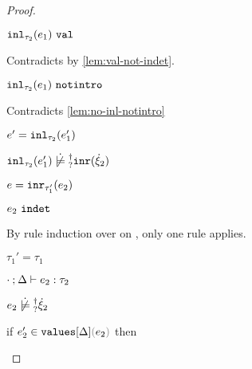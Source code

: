 \begin{proof}
\begin{byCases}
\begin{byCases}
\begin{byCases}
\begin{byCases}
            \begin{pfsteps*}
            \item $\mathtt{inl}_{\tau_2}({e_1}) ~\mathtt{val}$ 
            \end{pfsteps*}
            Contradicts  by \autoref{lem:val-not-indet}.
          \item[\text{(\ref{rule:IVIndet})}]
            \begin{pfsteps*}
            \item $\mathtt{inl}_{\tau_2}({e_1}) ~\mathtt{notintro}$ 
            \end{pfsteps*}
            Contradicts \autoref{lem:no-inl-notintro} 
          \item[\text{(\ref{rule:IVInl})}]
            \begin{pfsteps*}
            \item $e'=\mathtt{inl}_{\tau_2}({e_1'})$ 
            \item $\cnotsatisfyormay{\hinl{\tau_2}{e_1'}}{\cinr{\hxi_2}}$
            \end{pfsteps*}
          \end{byCases}
        \item[\text{(\ref{rule:IInr})}]
          \begin{pfsteps*}
          \item $e=\mathtt{inr}_{\tau_1'}({e_2})$ 
          \item $e_2 ~\mathtt{indet}$  
          \end{pfsteps*}
          By rule induction over  on , only one
          rule applies.
          \begin{byCases}
          \item[\text{(\ref{rule:TInr})}]
            \begin{pfsteps*}
            \item $\tau_1'=\tau_1$ 
            \item $\cdot \mathbin{;} \Delta \vdash e_2 : \tau_2$ 
            \item $\cnotsatisfyormay{e_2}{\hxi_2}$
            \item if $\inValues{e_2'}{\Delta}{e_2}$ then

\end{pfsteps*}
\end{byCases}
\end{byCases}
\end{byCases}
\end{byCases}
\end{proof}
